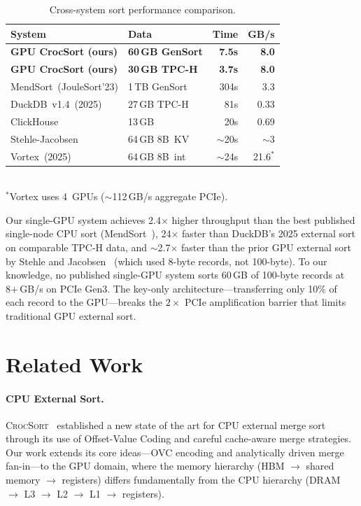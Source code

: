 \documentclass[conference,10pt]{IEEEtran}
\newcommand{\crocsort}{\textsc{CrocSort}\xspace}
\begin{document}
\begin{table}[t]
  \centering
  \caption{Cross-system sort performance comparison.}
  \label{tab:competitive}
  \begin{tabular}{@{}llrr@{}}
    \toprule
    \textbf{System} & \textbf{Data} & \textbf{Time} & \textbf{GB/s} \\
    \midrule
    \textbf{GPU CrocSort (ours)} & \textbf{60\,GB GenSort} & \textbf{7.5s} & \textbf{8.0} \\
    \textbf{GPU CrocSort (ours)} & \textbf{30\,GB TPC-H} & \textbf{3.7s} & \textbf{8.0} \\
    MendSort~(JouleSort'23) & 1\,TB GenSort & 304s & 3.3 \\
    DuckDB~v1.4~(2025) & 27\,GB TPC-H & 81s & 0.33 \\
    ClickHouse & 13\,GB & 20s & 0.69 \\
    Stehle-Jacobsen~\cite{stehle2017} & 64\,GB 8B~KV & ${\sim}$20s & ${\sim}$3 \\
    Vortex~(2025) & 64\,GB 8B~int & ${\sim}$24s & 21.6$^*$ \\
    \bottomrule
  \end{tabular}\\[2pt]
  \footnotesize{$^*$Vortex uses 4~GPUs (${\sim}$112\,GB/s aggregate PCIe).}
\end{table}

Our single-GPU system achieves 2.4$\times$ higher throughput than the
best published single-node CPU sort (MendSort~\cite{mendsort2023}),
24$\times$ faster than DuckDB's 2025 external sort on comparable
TPC-H data, and ${\sim}$2.7$\times$ faster than the prior GPU external
sort by Stehle and Jacobsen~\cite{stehle2017} (which used 8-byte records,
not 100-byte).  To our knowledge, no published single-GPU system sorts
60\,GB of 100-byte records at 8+\,GB/s on PCIe Gen3.  The key-only
architecture---transferring only 10\% of each record to the GPU---breaks
the $2\times$ PCIe amplification barrier that limits traditional
GPU external sort.


\section{Related Work}
\label{sec:related}

\paragraph{CPU External Sort.}
\crocsort~\cite{crocsort2026} established a new state of the art for CPU
external merge sort through its use of Offset-Value Coding and careful
cache-aware merge strategies.  Our work extends its core ideas---OVC
encoding and analytically driven merge fan-in---to the GPU domain, where
the memory hierarchy (HBM $\to$ shared memory $\to$ registers) differs
fundamentally from the CPU hierarchy (DRAM $\to$ L3 $\to$ L2 $\to$ L1
$\to$ registers).
\end{document}
